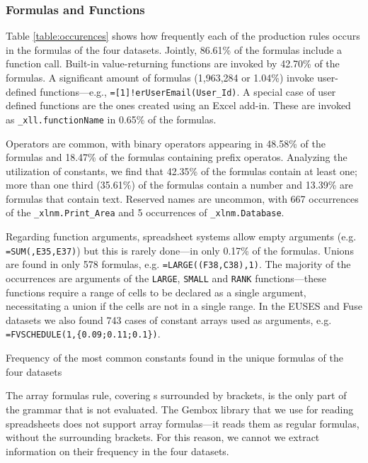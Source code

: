 \documentclass[times]{smrauth}
\begin{document}
\subsubsection{Formulas and Functions}

Table \ref{table:occurences} shows how frequently each of the production rules occurs in the formulas of the four datasets. Jointly, 86.61\% of the formulas include a function call. Built-in value-returning functions are invoked by 42.70\% of the formulas.
A significant amount of formulas (1,963,284	or 1.04\%) invoke user-defined functions---e.g., \texttt{=[1]!erUserEmail(User_Id)}. A special case of user defined functions are the ones created using an Excel add-in. These are invoked as \texttt{_xll.functionName} in 0.65\% of the formulas.

Operators are common, with binary operators appearing in 48.58\% of the formulas and 18.47\% of the formulas containing prefix operatos. Analyzing the utilization of constants, we find that 42.35\% of the formulas contain at least one; more than one third (35.61\%) of the formulas contain a number and 13.39\% are formulas that contain text. Reserved names are uncommon, with 667 occurrences of the \texttt{_xlnm.Print_Area} and 5 occurrences of \texttt{_xlnm.Database}.

Regarding function arguments, spreadsheet systems allow empty arguments (e.g. \texttt{=SUM(,E35,E37)}) but this is rarely done---in only 0.17\% of the formulas. Unions are found in only 578 formulas, e.g. \texttt{=LARGE((F38,C38),1)}. The majority of the occurrences are arguments of the \texttt{LARGE},  \texttt{SMALL} and \texttt{RANK} functions---these functions require a range of cells to be declared as a single argument, necessitating a union if the cells are not in a single range. In the EUSES and Fuse datasets we also found 743 cases of constant arrays used as arguments, e.g. \texttt{=FVSCHEDULE(1,\{0.09;0.11;0.1\})}.
\begin{table}[]
	\centering
	\caption{Frequency of the most common constants found in the unique formulas of the four datasets}
	\label{table:constants}
	
\end{table}

The array formulas rule, covering s surrounded by brackets, is the only part of the grammar that is not evaluated. The Gembox library that we use for reading spreadsheets does not support array formulas---it reads them as regular formulas, without the surrounding brackets. For this reason, we cannot we extract information on their frequency in the four datasets.
\end{document}
